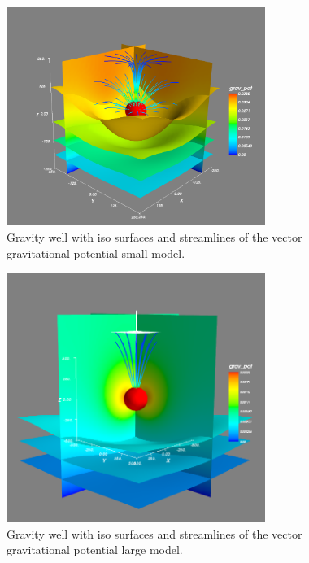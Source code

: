 \begin{figure}[htp]
\centering
\includegraphics[width=0.75\textwidth]{figures/ex10bpot.png}
\caption{Gravity well with iso surfaces and streamlines of the vector
gravitational potential \textemdash small model.}
\label{fig:ex10bpot}
\end{figure}

\begin{figure}[htp]
\centering
\includegraphics[width=0.75\textwidth]{figures/ex10bpot2.png}
\caption{Gravity well with iso surfaces and streamlines of the vector
gravitational potential \textemdash large model.}
\label{fig:ex10bpot2}
\end{figure}

